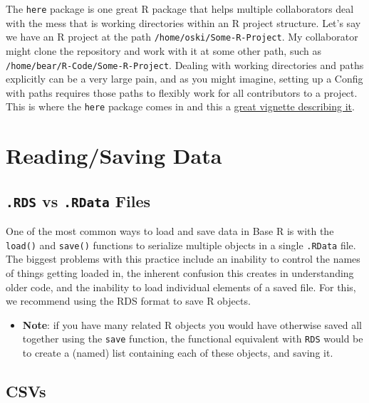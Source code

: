 \documentclass[]{book}
\providecommand{\tightlist}{%
  \setlength{\itemsep}{0pt}\setlength{\parskip}{0pt}}
\begin{document}
The \texttt{here} package is one great R package that helps multiple collaborators deal with the mess that is working directories within an R project structure. Let's say we have an R project at the path \texttt{/home/oski/Some-R-Project}. My collaborator might clone the repository and work with it at some other path, such as \texttt{/home/bear/R-Code/Some-R-Project}. Dealing with working directories and paths explicitly can be a very large pain, and as you might imagine, setting up a Config with paths requires those paths to flexibly work for all contributors to a project. This is where the \texttt{here} package comes in and this a \href{https://github.com/jennybc/here_here}{great vignette describing it}.

\hypertarget{readingsaving-data}{%
\section{Reading/Saving Data}\label{readingsaving-data}}

\hypertarget{rds-vs-.rdata-files}{%
\subsection{\texorpdfstring{\texttt{.RDS} vs \texttt{.RData} Files}{.RDS vs .RData Files}}\label{rds-vs-.rdata-files}}

One of the most common ways to load and save data in Base R is with the \texttt{load()} and \texttt{save()} functions to serialize multiple objects in a single \texttt{.RData} file. The biggest problems with this practice include an inability to control the names of things getting loaded in, the inherent confusion this creates in understanding older code, and the inability to load individual elements of a saved file. For this, we recommend using the RDS format to save R objects.

\begin{itemize}
\tightlist
\item
  \textbf{Note}: if you have many related R objects you would have otherwise saved all together using the \texttt{save} function, the functional equivalent with \texttt{RDS} would be to create a (named) list containing each of these objects, and saving it.
\end{itemize}

\hypertarget{csvs}{%
\subsection{CSVs}\label{csvs}}
\end{document}

